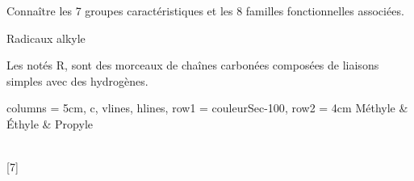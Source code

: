 \tetePremStssOrga
\vspace*{-34pt}

\begin{objectifs}
  \item Connaître les 7 groupes caractéristiques et les 8 familles fonctionnelles associées.
\end{objectifs}



\begin{doc}{Radicaux alkyle}
  \begin{importants}
    Les  notés R, sont des morceaux de chaînes carbonées composées de liaisons simples avec des hydrogènes.
  \end{importants}

  \centering
  \begin{tblr}{
    columns = {5cm, c}, vlines, hlines,
    row{1} = {couleurSec-100},
    row{2} = {4cm}
  }
    Méthyle & Éthyle & Propyle \\
    \\
  \end{tblr}
\end{doc}

[7]


